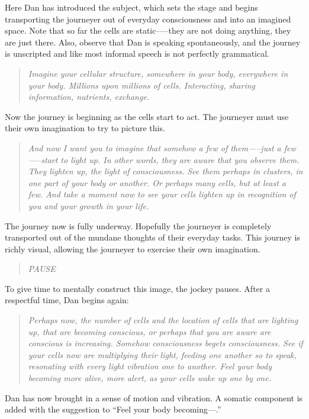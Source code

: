 \documentclass[12pt]{book}
\begin{document}
Here Dan has introduced the subject, which sets the stage and begins
transporting the journeyer out of everyday consciousness and into an
imagined space. Note that so far the cells are static—--they are not
doing anything, they are just there. Also, observe that Dan is speaking
spontaneously, and the journey is unscripted and like most informal
speech is not perfectly grammatical.

\begin{quote}{\em
Imagine your cellular structure, somewhere in your body, everywhere in
your body. Millions upon millions of cells. Interacting, sharing
information, nutrients, exchange.  }\end{quote} Now the journey is
beginning as the cells start to act. The journeyer must use their own
imagination to try to picture this.


\begin{quote}{\em
And now I want you to imagine that somehow a few of them—--just a
few—--start to light up. In other words, they are aware that you
observe them. They lighten up, the light of consciousness. See them
perhaps in clusters, in one part of your body or another. Or perhaps
many cells, but at least a few. And take a moment now to see your
cells lighten up in recognition of you and your growth in your life.
}\end{quote}

The journey now is fully underway. Hopefully the journeyer is
completely transported out of the mundane thoughts of their everyday
tasks. This journey is richly visual, allowing the journeyer to
exercise their own imagination.

\begin{quote}{\em
  PAUSE }\end{quote}

To give time to mentally construct this image, the jockey
pauses. After a respectful time, Dan begins again:

\begin{quote}{\em
Perhaps now, the number of cells and the location of cells that are
lighting up, that are becoming conscious, or perhaps that you are
aware are conscious is increasing. Somehow consciousness begets
consciousness. See if your cells now are multiplying their light,
feeding one another so to speak, resonating with every light vibration
one to another. Feel your body becoming more alive, more alert, as
your cells wake up one by one.  }\end{quote}


Dan has now brought in a sense of motion and vibration. A somatic
component is added with the suggestion to ``Feel your body becoming---.''
\end{document}
